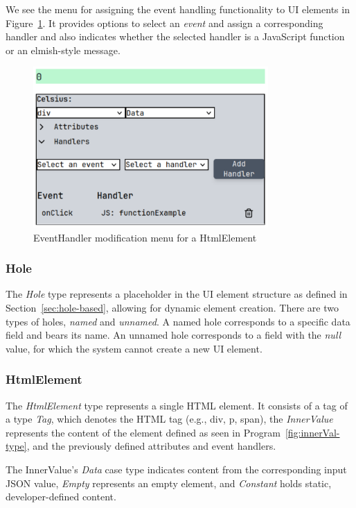 We see the menu for assigning the event handling functionality to UI elements in Figure~\ref{fig:handler-menu}.
It provides options to select an \emph{event} and assign a corresponding handler and also indicates whether the selected handler is a JavaScript function or an elmish-style message.
\begin{figure}[H]
	\begin{center}
		\includegraphics[width=0.8\textwidth]{img/handler-menu.pdf}
	\end{center}
	\caption{EventHandler modification menu for a HtmlElement}\label{fig:handler-menu}
\end{figure}

\subsubsection{Hole}
The \emph{Hole} type represents a placeholder in the UI element structure as defined in Section~\ref{sec:hole-based}, allowing for dynamic element creation.
There are two types of holes, \emph{named} and \emph{unnamed}.
A named hole corresponds to a specific data field and bears its name.
An unnamed hole corresponds to a field with the \emph{null} value, for which the system cannot create a new UI element.

\subsubsection{HtmlElement}
The \emph{HtmlElement} type represents a single HTML element.
It consists of a tag of a type \emph{Tag}, which denotes the HTML tag (e.g., div, p, span),
the \emph{InnerValue} represents the content of the element defined as seen in Program~\ref{fig:innerVal-type}, and the previously defined attributes and event handlers.

The InnerValue's \emph{Data} case type indicates content from the corresponding input JSON value, \emph{Empty} represents an empty element, and \emph{Constant} holds static, developer-defined content.

